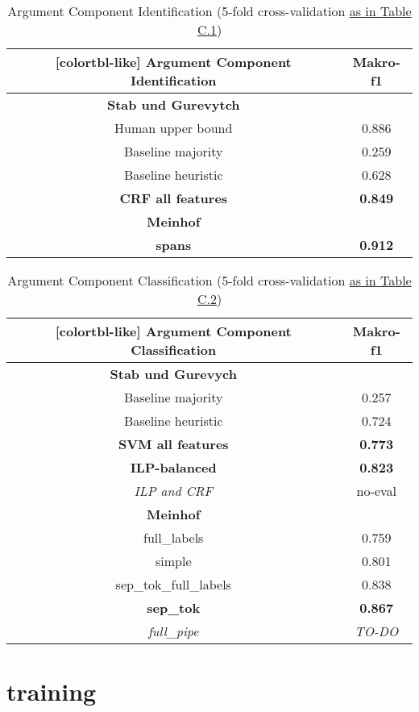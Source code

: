 \documentclass[12]{article}
\newcommand\T{\rule{0pt}{3.5ex}}       %
\newcommand\I{\rule[-1.25ex]{0pt}{0pt}} %
\newcommand\B{\rule[-2.0ex]{0pt}{0pt}} %
\theoremstyle{mytheoremstyle}
\theoremstyle{mytheoremstyle}
\theoremstyle{myproblemstyle}
\begin{document}
  \begin{table}[!h]
    \centering
    \begin{NiceTabular}{c|c}[colortbl-like]
      \large\textbf{Argument Component Identification} &  \large\textbf{Makro-f1}\\ 
      \hline
      \hline
      \textbf{Stab und Gurevytch}& \T \I \\
      Human upper bound & 0.886\\
      Baseline majority & 0.259\\
      Baseline heuristic & 0.628\\
      \textbf{CRF all features} & \textbf{0.849}\B\\
      \hline
      \textbf{Meinhof} & \T \I \\
      \textbf{spans} & \textbf{0.912}\\ 
    \end{NiceTabular}
    \caption{Argument Component Identification (5-fold cross-validation \href{https://aclanthology.org/J17-3005.pdf}{as in Table C.1})}
    \label{tab:ident_f1}
  \end{table}

  \begin{table}[!h]
    \centering
    \begin{NiceTabular}{c|c}[colortbl-like]
      \large\textbf{Argument Component Classification} &  \large\textbf{Makro-f1}\\
      \hline
      \hline
      \textbf{Stab und Gurevych} & \T \I \\
      Baseline majority & 0.257\\
      Baseline heuristic & 0.724\\
      \textbf{SVM all features} & \textbf{0.773}\\
      \textbf{ILP-balanced} & \textbf{0.823}\\
      \textit{ILP and CRF} & no-eval \B \\
      \hline
      \textbf{Meinhof} & \T \I \\
      full\_labels & 0.759\\
      simple & 0.801\\
      sep\_tok\_full\_labels & 0.838\\
      \textbf{sep\_tok} & \textbf{0.867}\\
      \textit{full\_pipe} & \textit{TO-DO}\\

    \end{NiceTabular}
    \caption{Argument Component Classification (5-fold cross-validation \href{https://aclanthology.org/J17-3005.pdf}{as in Table C.2})}
    \label{tab:class_f1}
  \end{table}

  \section{training\dotfill}
\end{document}
